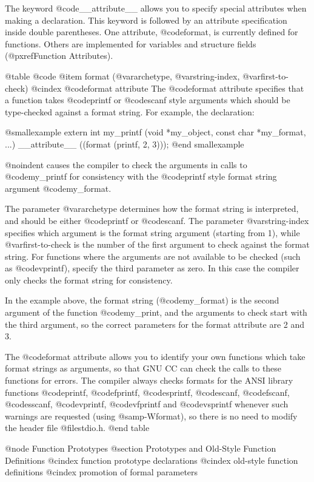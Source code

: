 {The keyword @code{__attribute__} allows you to specify special
attributes when making a declaration.  This keyword is followed by an
attribute specification inside double parentheses.  One attribute,
@code{format}, is currently defined for functions.  Others are
implemented for variables and structure fields (@pxref{Function
Attributes}).

@table @code
@item format (@var{archetype}, @var{string-index}, @var{first-to-check})
@cindex @code{format} attribute
The @code{format} attribute specifies that a function takes @code{printf}
or @code{scanf} style arguments which should be type-checked against a
format string.  For example, the declaration:

@smallexample
extern int
my_printf (void *my_object, const char *my_format, ...)
      __attribute__ ((format (printf, 2, 3)));
@end smallexample

@noindent
causes the compiler to check the arguments in calls to @code{my_printf}
for consistency with the @code{printf} style format string argument
@code{my_format}.

The parameter @var{archetype} determines how the format string is
interpreted, and should be either @code{printf} or @code{scanf}.  The
parameter @var{string-index} specifies which argument is the format
string argument (starting from 1), while @var{first-to-check} is the
number of the first argument to check against the format string.  For
functions where the arguments are not available to be checked (such as
@code{vprintf}), specify the third parameter as zero.  In this case the
compiler only checks the format string for consistency.

In the example above, the format string (@code{my_format}) is the second
argument of the function @code{my_print}, and the arguments to check
start with the third argument, so the correct parameters for the format
attribute are 2 and 3.

The @code{format} attribute allows you to identify your own functions
which take format strings as arguments, so that GNU CC can check the
calls to these functions for errors.  The compiler always checks formats
for the ANSI library functions @code{printf}, @code{fprintf},
@code{sprintf}, @code{scanf}, @code{fscanf}, @code{sscanf},
@code{vprintf}, @code{vfprintf} and @code{vsprintf} whenever such
warnings are requested (using @samp{-Wformat}), so there is no need to
modify the header file @file{stdio.h}.
@end table

@node Function Prototypes
@section Prototypes and Old-Style Function Definitions
@cindex function prototype declarations
@cindex old-style function definitions
@cindex promotion of formal parameters

}
